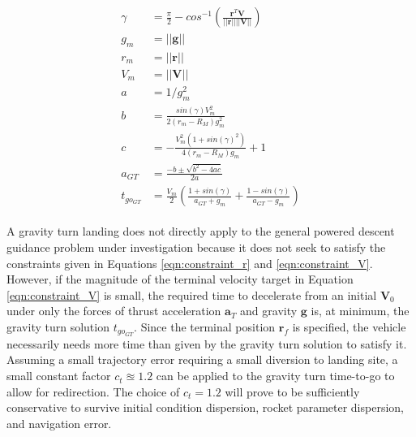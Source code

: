 \begin{align}
\label{eqn:tgoGT}
\begin{split}
\gamma &= \frac{\pi}{2} - cos^{-1}\left(\frac{\bm{r}^T\bm{V}}{||\bm{r}||||\bm{V} ||} \right) \\
g_m &= ||\bm{g}|| \\
r_m &= ||\bm{r}|| \\
V_m &= ||\bm{V}|| \\
a &= 1/g_m^2 \\
b &= \frac{sin(\gamma)V_m^2}{2(r_m-R_M)g_m^2} \\
c &= -\frac{V_m^2 (1+sin(\gamma)^2)}{4(r_m - R_M)g_m}+1 \\
a_{GT} &= \frac{-b \pm \sqrt{b^2 - 4 a c}}{2 a} \\
t_{go_{GT}} &= \frac{V_m}{2} \left(\frac{1+sin(\gamma)}{a_{GT} + g_m} + \frac{1-sin(\gamma)}{a_{GT} - g_m} \right)
\end{split}
\end{align}

A gravity turn landing does not directly apply to the general powered descent guidance problem under investigation because it does not seek to satisfy the constraints given in Equations \ref{eqn:constraint_r} and \ref{eqn:constraint_V}. However, if the magnitude of the terminal velocity target in Equation \ref{eqn:constraint_V} is small, the required time to decelerate from an initial $\bm{V}_0$ under only the forces of thrust acceleration $\bm{a}_T$ and gravity $\bm{g}$ is, at minimum, the gravity turn solution $t_{go_{GT}}$. Since the terminal position $\bm{r}_f$ is specified, the vehicle necessarily needs more time than given by the gravity turn solution to satisfy it. Assuming a small trajectory error requiring a small diversion to landing site, a small constant factor $ c_t \approxeq 1.2$ can be applied to the gravity turn time-to-go to allow for redirection. The choice of $c_t = 1.2$ will prove to be sufficiently conservative to survive initial condition dispersion, rocket parameter dispersion, and navigation error. 

